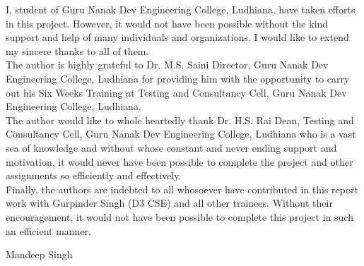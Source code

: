 \begin{Large}
\end{Large}

I, student of Guru Nanak Dev Engineering College, Ludhiana, have taken efforts in this project.
However, it would not have been possible without the kind support and help of many individuals
and organizations. I would like to extend my sincere thanks to all of them.\\

The author is highly grateful to Dr. M.S. Saini Director, Guru Nanak Dev Engineering College, Ludhiana for providing him with the opportunity to carry out his Six Weeks Training at
Testing and Consultancy Cell, Guru Nanak Dev Engineering College, Ludhiana.\\

The author would like to whole heartedly thank Dr. H.S. Rai Dean, Testing and Consultancy
Cell, Guru Nanak Dev Engineering College, Ludhiana who is a vast sea of knowledge and without whose constant and never ending support and motivation, it would never have been possible to complete the project and other assignments so efficiently and effectively.\\

Finally, the authors are indebted to all whosoever have contributed in
this report work with Gurpinder Singh (D3 CSE) and all other trainees. Without their 
encouragement, it would not have been possible to complete this project
in such an efficient manner.





\vskip 1.0cm 
\noindent Mandeep Singh
